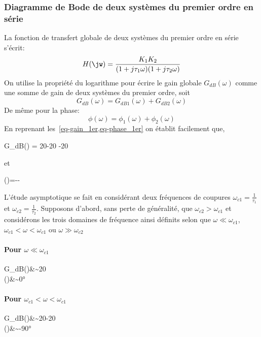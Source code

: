 \subsubsection{Diagramme de Bode de deux systèmes du premier ordre en série }
La fonction de transfert globale de deux systèmes du premier ordre en série 
s'écrit:
\begin{align}
H(\jw)=\dfrac{K_1K_2}{(1+j\tau_1\omega)(1+j\tau_2\omega)}\label{eq-1er_serie}
\end{align}
On utilise la propriété du logarithme pour écrire le gain globale 
$G_{dB}(\omega)$ comme une somme de gain de deux systèmes du premier ordre, 
soit
$$
G_{dB}(\omega) = G_{dB1}(\omega) + G_{dB2}(\omega)
$$
De même pour la phase:
$$
\phi(\omega)= \phi_1(\omega) + \phi_2(\omega)
$$
En reprenant les~\cref{eq-gain_1er,eq-phase_1er} on établit facilement que,
\begin{bequation}
G_{dB}(\omega) = 20-20
                -20
\end{bequation}
et
\begin{bequation}
\phi(\omega)=-\arctan{\tau_1\omega}-\arctan{\tau_2\omega}
\end{bequation}

L'étude asymptotique se fait en considérant deux fréquences de coupures 
$\omega_{c1}=\frac{1}{\tau_1}$ et $\omega_{c2}=\frac{1}{\tau_2}$.
Supposons d'abord, sans perte de généralité, que $\omega_{c2}>\omega_{c1}$ et 
considérons 
les trois domaines de fréquence ainsi définits selon que 
$\omega\ll\omega_{c1}$, $\omega_{c1}<\omega<\omega_{c1}$ ou 
$\omega\gg\omega_{c2}$

\paragraph{Pour $\omega\ll\omega_{c1}$}
\begin{bequation}
G_{dB}(\omega)&\sim20\\
    \phi(\omega)&\sim0\si{\degree}
\end{bequation}

\paragraph{Pour $\omega_{c1}<\omega<\omega_{c1}$}
\begin{bequation}
G_{dB}(\omega)&\sim20-20\\
\phi(\omega)&\sim-90\si{\degree}
\end{bequation}
